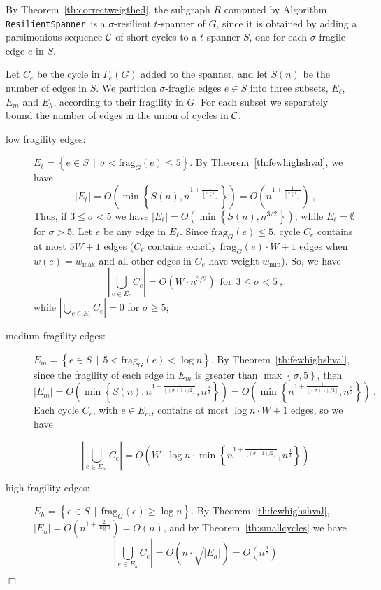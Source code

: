 \documentclass{article}
\newcommand{\frag}          {\mathrm{frag}}
\newcommand{\qed}{\hfill \ensuremath{\Box}}
\newenvironment{proof}{\vspace{1ex}\noindent{\bf Proof.}\hspace{0.5em}}
	{\hfill\qed\vspace{2ex}}
\newcommand{\floor}[1]       {\left\lfloor #1 \right\rfloor}
\newcommand{\round}[1]       {\left( #1 \right)}
\newcommand{\braces}[1]       {\left\{ #1 \right\}}
\newcommand{\ResilientSpanner}{\texttt{ResilientSpanner}}
\begin{document}
\begin{proof}
By Theorem~\ref{th:correctweigthed}, the subgraph $R$ computed by Algorithm \ResilientSpanner\ is a $\sigma$-resilient $t$-spanner of $G$, since it is obtained by adding a parsimonious sequence $\cal{C}$ of short cycles to a $t$-spanner $S$, one for each $\sigma$-fragile edge $e$ in $S$.

Let $C_e$ be the cycle in $\Gamma_e(G)$ added to the spanner, and let $S(n)$ be the number of edges in $S$.
We partition $\sigma$-fragile edges $e \in S$ into three subsets, $E_{\ell}$, $E_{m}$ and $E_{h}$, according to their fragility in $G$. For each subset we separately bound the number of edges in the union of cycles in $\cal{C}$.
\begin{description}
\item[low fragility edges:] $E_{\ell} = \left\{ e \in S \ \ | \ \  \sigma < \frag_G(e) \leq 5 \right\}$. By Theorem~\ref{th:fewhighshval}, we have
$$|E_{\ell}| = O\left(\min\braces{S(n), n^{1+\frac{1}{\floor{\frac{\sigma+1}{2}}}}}\right) 
= O\left(n^{1+\frac{1}{\floor{\frac{\sigma+1}{2}}}}\right) \ ,$$
Thus, if $3 \leq \sigma < 5$ we have
$|E_{\ell}| = O\left(\min\braces{S(n), n^{3/2}}\right)$, while $E_\ell = \emptyset$ for $\sigma > 5$.
Let $e$ be any edge in $E_{\ell}$. Since $\frag_G(e) \leq 5$, cycle $C_e$ contains at most $5 W+1$ edges ($C_e$ contains exactly $\frag_G(e) \cdot W+1$ edges when $w(e) = w_\mathrm{max}$ and all other edges in $C_e$ have weight $w_\mathrm{min}$). So, we have
$$\left|\bigcup_{e \in E_\ell} C_e \right| = O\left(W \cdot n^{3/2}\right)\ \ 
\mathrm{for}\ \ 3 \leq \sigma < 5\ ,$$
while $\left|\bigcup_{e \in E_\ell} C_e \right| = 0$ for $\sigma\geq 5$;

\item [medium fragility edges:] $E_m = \left\{ e \in S \ \ | \ \  5 < \frag_G(e) < \log n \right\}$. By Theorem~\ref{th:fewhighshval}, since the fragility of each edge in $E_{m}$ is greater than $\max\braces{\sigma, 5}$, then
$$|E_{m}| = O\round{\min\braces{S(n),n^{1 + \frac{1}{\floor{(\sigma + 1)/2}}}, n^{\frac 4 3}}}
= O\round{\min\braces{n^{1 + \frac{1}{\floor{(\sigma + 1)/2}}}, n^{\frac 4 3}}}\ .$$
Each cycle $C_e$, with $e \in E_{m}$, contains at most $\log n \cdot W+1$ edges, so we have

$$\left|\bigcup_{e \in E_m} C_e \right| = O\round{W \cdot \log n \cdot \min\braces{n^{1 + \frac{1}{\floor{(\sigma + 1)/2}}}, n^{\frac 4 3}}}$$

\item [high fragility edges:] $E_h = \left\{ e \in S \ \ | \ \  \frag_G(e) \geq \log n\right\}$. By Theorem~\ref{th:fewhighshval}, $|E_{h}| = O\left(n^{1+\frac{2}{\log n}}\right) = O(n)$, and by Theorem~\ref{th:smallcycles} we have
$$\left|\bigcup_{e \in E_h} C_e \right| = O\left(n \cdot \sqrt{|E_h|}\right) = O\left(n^{\frac{3}{2}}\right)$$


\end{description}
\end{proof}
\end{document}

